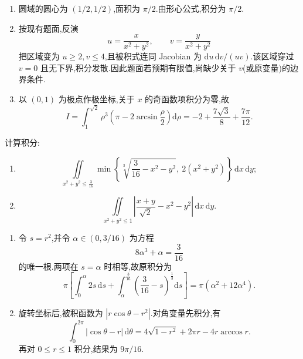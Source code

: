 \begin{solution}
    \leavevmode
    \begin{enumerate}
        \item 圆域的圆心为 $(1/2,1/2)$,面积为 $\pi/2$.由形心公式,积分为 $\pi/2$.
        \item 按现有题面,反演
              \[
                  u=\dfrac{x}{x^2+y^2},\qquad v=\dfrac{y}{x^2+y^2}
              \]
              把区域变为 $u\geq2,v\leq4$,且被积式连同 Jacobian 为 $\mathrm{d}u\,\mathrm{d}v/(uv)$.该区域穿过 $v=0$ 且无下界,积分发散.因此题面若预期有限值,尚缺少关于 $v$(或原变量)的边界条件.
        \item 以 $(0,1)$ 为极点作极坐标,关于 $x$ 的奇函数项积分为零,故
              \[
                  I=\int_1^{\sqrt2}\rho^3\left(\pi-2\arcsin\dfrac{\rho}{2}\right)\mathrm{d}\rho
                  =-2+\dfrac{7\sqrt3}{8}+\dfrac{7\pi}{12}.
              \]
    \end{enumerate}
\end{solution}

\begin{example}
    计算积分:
    \begin{enumerate}
        \item
              \[
                  \displaystyle\iint\limits_{x^2+y^2\leq\frac{3}{16}}
                  \min\left\{\sqrt[3]{\dfrac{3}{16}-x^2-y^2},\ 2(x^2+y^2)\right\}\,\mathrm{d}x\,\mathrm{d}y;
              \]
        \item
              \[
                  \displaystyle\iint\limits_{x^2+y^2\leq1}\left|\dfrac{x+y}{\sqrt{2}}-x^2-y^2\right|\,\mathrm{d}x\,\mathrm{d}y.
              \]
    \end{enumerate}
\end{example}
\exampleblank

\begin{solution}
    \leavevmode
    \begin{enumerate}
        \item 令 $s=r^2$,并令 $\alpha\in(0,3/16)$ 为方程
              \[
                  8\alpha^3+\alpha=\dfrac{3}{16}
              \]
              的唯一根.两项在 $s=\alpha$ 时相等,故原积分为
              \[
                  \pi\left[\int_0^\alpha2s\,\mathrm{d}s
                      +\int_\alpha^{\frac{3}{16}}\left(\dfrac{3}{16}-s\right)^{\frac{1}{3}}\mathrm{d}s\right]
                  =\pi\left(\alpha^2+12\alpha^4\right).
              \]
        \item 旋转坐标后,被积函数为 $|r\cos\theta-r^2|$.对角变量先积分,有
              \[
                  \displaystyle\int_0^{2\pi}|\cos\theta-r|\,\mathrm{d}\theta
                  =4\sqrt{1-r^2}+2\pi r-4r\arccos r.
              \]
              再对 $0\leq r\leq1$ 积分,结果为 $9\pi/16$.
    \end{enumerate}
\end{solution}

